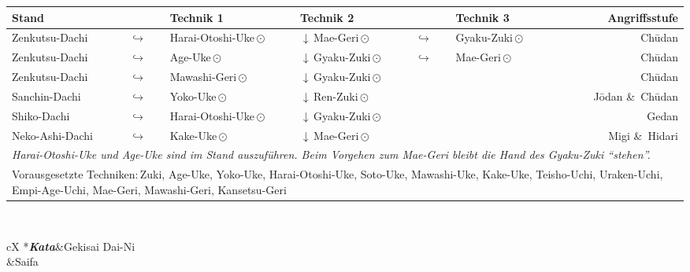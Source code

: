 \begin{tcolorbox}[colframe=BLBELT,colback=white,coltitle=white,title=5. Kyu:\indent Kihon-Ido Kata - Partnerformen - Erwartungshorizont]
\null\vfill\null
{}
	\begin{tabularx}{\textwidth}{lllllXr}
		\textbf{Stand} 	&  	& \textbf{Technik 1} & \textbf{Technik 2} & &\textbf{Technik 3} & \textbf{Angriffsstufe}\\
		\midrule
		Zenkutsu-Dachi 	& \(\hookrightarrow\)	& Harai-Otoshi-Uke\,\(\odot\) 	& \(\downarrow\)\,Mae-Geri\,\(\odot\)	& \(\hookrightarrow\) 	& Gyaku-Zuki\,\(\odot\)	& Ch\={u}dan \\
		Zenkutsu-Dachi 	& \(\hookrightarrow\)	& Age-Uke\,\(\odot\) 			& \(\downarrow\)\,Gyaku-Zuki\,\(\odot\) & \(\hookrightarrow\)	& Mae-Geri\,\(\odot\)	& Ch\={u}dan \\
		Zenkutsu-Dachi 	& \(\hookrightarrow\)	& Mawashi-Geri\,\(\odot\) 		& \(\downarrow\)\,Gyaku-Zuki\,\(\odot\) 				&						&	 					& Ch\={u}dan \\
		Sanchin-Dachi 	& \(\hookrightarrow\)	& Yoko-Uke\,\(\odot\) 			& \(\downarrow\)\,Ren-Zuki\,\(\odot\) 					&						& 						& J\={o}dan \&~Ch\={u}dan \\
		Shiko-Dachi 	& \(\hookrightarrow\)	& Harai-Otoshi-Uke\,\(\odot\) 	& \(\downarrow\)\,Gyaku-Zuki\,\(\odot\) 				&						& 						& Gedan \\
		Neko-Ashi-Dachi	& \(\hookrightarrow\)	& Kake-Uke\,\(\odot\) 			& \(\downarrow\)\,Mae-Geri\,\(\odot\) 					&						& 						& Migi \&~Hidari  \\
		\multicolumn{7}{l}{{\scriptsize \textit{Harai-Otoshi-Uke und Age-Uke sind im Stand auszuführen. Beim Vorgehen zum Mae-Geri bleibt die Hand des Gyaku-Zuki \textquotedblleft{stehen}\textquotedblright .}}}\\
		\midrule
		\multicolumn{7}{p{\linewidth-2\tabcolsep}}{{\footnotesize Vorausgesetzte Techniken:\,Zuki, Age-Uke, Yoko-Uke, Harai-Otoshi-Uke, Soto-Uke, Mawashi-Uke, Kake-Uke, Teisho-Uchi, Uraken-Uchi, Empi-Age-Uchi, Mae-Geri, Mawashi-Geri, Kansetsu-Geri}}\\
		\midrule
	\end{tabularx}\\
	\null\vfill\null
	\begin{minipage}[t]{0.45\textwidth}
		\begin{tabularx}{\textwidth}{cX}
			\midrule
			*{\textbf{\textit{Kata}}}&Gekisai Dai-Ni\\
			&Saifa \\

\end{tabularx}
\end{minipage}
\end{tcolorbox}
